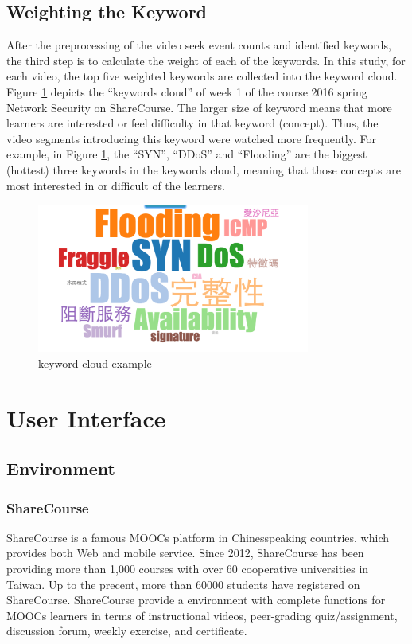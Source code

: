 \subsection{Weighting the Keyword}
After the preprocessing of the video seek event counts and identified keywords, the third step is to calculate the weight of each of the keywords. In this study, for each video, the top five weighted keywords are collected into the keyword cloud.
Figure \ref{fig:keywordcloud} depicts the “keywords cloud” of week 1 of the course 2016 spring Network Security on ShareCourse. The larger size of keyword means that more learners are interested or feel difficulty in that keyword (concept). Thus, the video segments introducing this keyword were watched more frequently.
For example, in Figure \ref{fig:keywordcloud}, the ``SYN'', ``DDoS'' and ``Flooding'' are the biggest (hottest) three keywords in the keywords cloud, meaning that those concepts are most interested in or difficult of the learners.

\begin{figure}[H]
    \centering
    \includegraphics[width = 0.8\textwidth]{fig/wordcloud.png}
    \caption{keyword cloud example}
    \label{fig:keywordcloud}
\end{figure}

\section{User Interface}
\subsection{Environment}
\subsubsection{ShareCourse}
ShareCourse \cite{sharecourse} is a famous MOOCs platform in Chinesspeaking countries, which provides both Web and mobile service.
Since 2012, ShareCourse has been providing more than 1,000 courses with over 60 cooperative universities in Taiwan.
Up to the precent, more than 60000 students have registered on ShareCourse.
ShareCourse provide a environment with complete functions for MOOCs learners in terms of instructional videos, peer-grading quiz/assignment, discussion forum, weekly exercise, and certificate.

